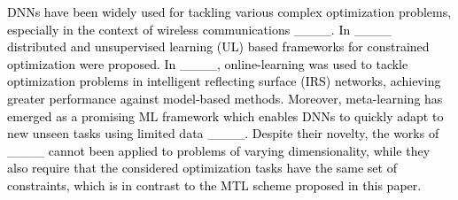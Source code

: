 \textcolor{black}{ DNNs have  been widely used for tackling various complex optimization problems, especially in the context of wireless communications ____.  In ____ distributed and unsupervised learning (UL) based frameworks for constrained optimization were proposed. In ____, online-learning was used to tackle optimization problems in intelligent reflecting surface (IRS) networks, achieving greater performance against model-based methods. Moreover, meta-learning has emerged as a promising ML framework which enables DNNs to quickly adapt to new unseen tasks  using limited data ____.  Despite their novelty, the works of ____  cannot been applied to problems of varying dimensionality, while they also require that  the considered optimization tasks have the same set of constraints, which is in contrast to the MTL scheme proposed in this paper.}
